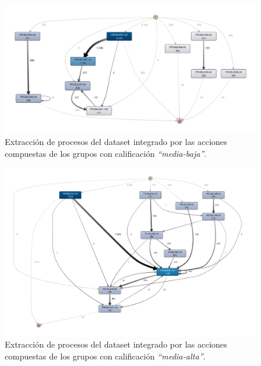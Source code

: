 \begin{figure}[H]
    \centering
    \includegraphics[width=1.25\textwidth]{imagenes/DISCO_compound/MidLowGrades.png}
    \caption{Extracción de procesos del dataset integrado por las acciones compuestas de los grupos con calificación \emph{``media-baja''}.}
    \label{fig:midLowGrades}
\end{figure}

\begin{figure}[H]
    \centering
    \includegraphics[width=1.25\textwidth]{imagenes/DISCO_compound/MidHighGrades.png}
    \caption{Extracción de procesos del dataset integrado por las acciones compuestas de los grupos con calificación \emph{``media-alta''}.}
    \label{fig:midHighGrades}
\end{figure}

